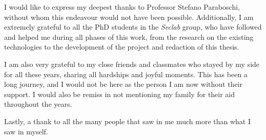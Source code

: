 I would like to express my deepest thanks to Professor Stefano Paraboschi, without whom
this endeavour would not have been possible.
Additionally, I am extremely grateful to all the PhD students in the \textit{Seclab} group,
who have followed and helped me during all phases of this work, from the research on
the existing technologies to the development of the project and redaction of this thesis.

I am also very grateful to my close friends and classmates who stayed by my side
for all these years, sharing all hardships and joyful moments.
This has been a long journey, and I would not be here as the person I am now
without their support.
I would also be remiss in not mentioning my family for their aid throughout the years.

Lastly, a thank to all the many people that saw in me much more than what I saw in myself.